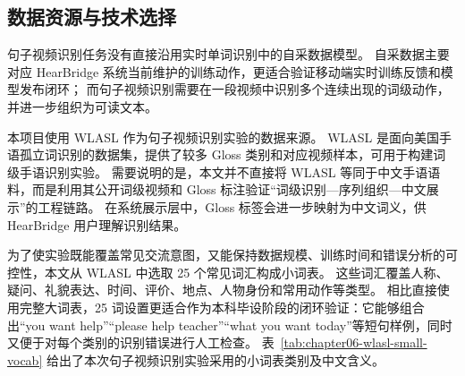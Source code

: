 
\subsection{数据资源与技术选择}

句子视频识别任务没有直接沿用实时单词识别中的自采数据模型。
自采数据主要对应 HearBridge 系统当前维护的训练动作，更适合验证移动端实时训练反馈和模型发布闭环；
而句子视频识别需要在一段视频中识别多个连续出现的词级动作，并进一步组织为可读文本。

本项目使用 WLASL 作为句子视频识别实验的数据来源。
WLASL 是面向美国手语孤立词识别的数据集，提供了较多 Gloss 类别和对应视频样本，可用于构建词级手语识别实验\cite{li-wlasl-2020}。
需要说明的是，本文并不直接将 WLASL 等同于中文手语语料，而是利用其公开词级视频和 Gloss 标注验证“词级识别—序列组织—中文展示”的工程链路。
在系统展示层中，Gloss 标签会进一步映射为中文词义，供 HearBridge 用户理解识别结果。

为了使实验既能覆盖常见交流意图，又能保持数据规模、训练时间和错误分析的可控性，本文从 WLASL 中选取 25 个常见词汇构成小词表。
这些词汇覆盖人称、疑问、礼貌表达、时间、评价、地点、人物身份和常用动作等类型。
相比直接使用完整大词表，25 词设置更适合作为本科毕设阶段的闭环验证：它能够组合出“you want help”“please help teacher”“what you want today”等短句样例，同时又便于对每个类别的识别错误进行人工检查。
表~\ref{tab:chapter06-wlasl-small-vocab} 给出了本次句子视频识别实验采用的小词表类别及中文含义。


